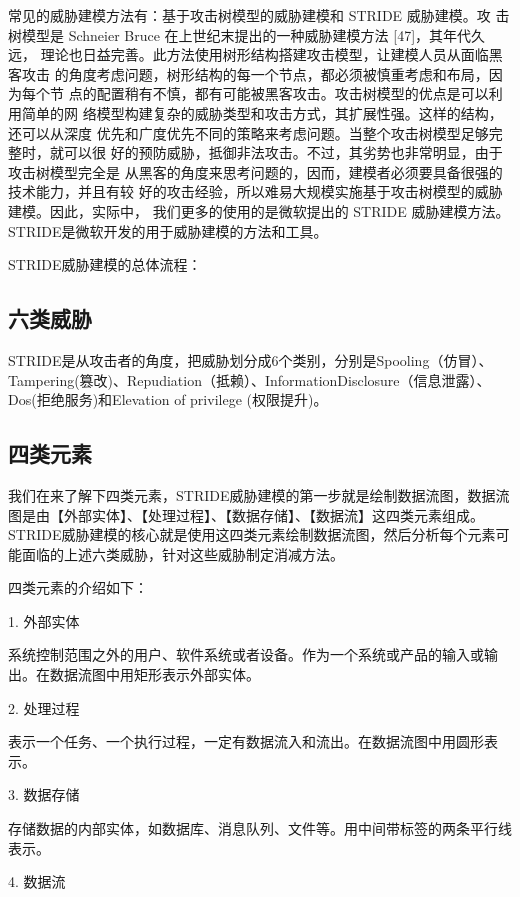 常见的威胁建模方法有：基于攻击树模型的威胁建模和 STRIDE 威胁建模。攻
击树模型是 Schneier Bruce 在上世纪末提出的一种威胁建模方法 [47]，其年代久远，
理论也日益完善。此方法使用树形结构搭建攻击模型，让建模人员从面临黑客攻击
的角度考虑问题，树形结构的每一个节点，都必须被慎重考虑和布局，因为每个节
点的配置稍有不慎，都有可能被黑客攻击。攻击树模型的优点是可以利用简单的网
络模型构建复杂的威胁类型和攻击方式，其扩展性强。这样的结构，还可以从深度
优先和广度优先不同的策略来考虑问题。当整个攻击树模型足够完整时，就可以很
好的预防威胁，抵御非法攻击。不过，其劣势也非常明显，由于攻击树模型完全是
从黑客的角度来思考问题的，因而，建模者必须要具备很强的技术能力，并且有较
好的攻击经验，所以难易大规模实施基于攻击树模型的威胁建模。因此，实际中，
我们更多的使用的是微软提出的 STRIDE 威胁建模方法。
\newline
STRIDE是微软开发的用于威胁建模的方法和工具。

STRIDE威胁建模的总体流程：

\subsection[]{六类威胁}

STRIDE是从攻击者的角度，把威胁划分成6个类别，分别是Spooling（仿冒）、Tampering(篡改)、Repudiation（抵赖）、InformationDisclosure（信息泄露）、Dos(拒绝服务)和Elevation of privilege (权限提升)。

\subsection[]{四类元素}

我们在来了解下四类元素，STRIDE威胁建模的第一步就是绘制数据流图，数据流图是由【外部实体】、【处理过程】、【数据存储】、【数据流】这四类元素组成。STRIDE威胁建模的核心就是使用这四类元素绘制数据流图，然后分析每个元素可能面临的上述六类威胁，针对这些威胁制定消减方法。

四类元素的介绍如下：

1.  外部实体

系统控制范围之外的用户、软件系统或者设备。作为一个系统或产品的输入或输出。在数据流图中用矩形表示外部实体。

2.  处理过程

表示一个任务、一个执行过程，一定有数据流入和流出。在数据流图中用圆形表示。

3.  数据存储

存储数据的内部实体，如数据库、消息队列、文件等。用中间带标签的两条平行线表示。

4.  数据流

